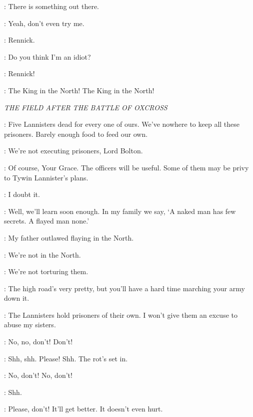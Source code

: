 
\LANNISTERGUARD: There is something out there. 

\RENNICK: Yeah, don't even try me. 

\LANNISTERGUARD: Rennick. 

\RENNICK: Do you think I'm an idiot? 

\LANNISTERGUARD: Rennick! 


\STARKARMY: The King in the North! The King in the North! 


\scene

\textit{THE FIELD AFTER THE BATTLE OF OXCROSS} 


\ROOSE: Five Lannisters dead for every one of ours. We've nowhere to keep all these prisoners. Barely enough food to feed our own. 

\ROBB: We're not executing prisoners, Lord Bolton. 

\ROOSE: Of course, Your Grace. The officers will be useful. Some of them may be privy to Tywin Lannister's plans. 

\ROBB: I doubt it. 

\ROOSE: Well, we'll learn soon enough. In my family we say, `A naked man has few secrets. A flayed man none.' 

\ROBB: My father outlawed flaying in the North. 

\ROOSE: We're not in the North. 

\ROBB: We're not torturing them. 

\ROOSE: The high road's very pretty, but you'll have a hard time marching your army down it. 

\ROBB: The Lannisters hold prisoners of their own. I won't give them an excuse to abuse my sisters. 


\WOUNDEDLANNISTER: No, no, don't! Don't! 

\TALISA: Shh, shh. Please! Shh. The rot's set in. 

\WOUNDEDLANNISTER: No, don't! No, don't! 

\TALISA: Shh. 

\WOUNDEDLANNISTER: Please, don't! It'll get better. It doesn't even hurt. 

